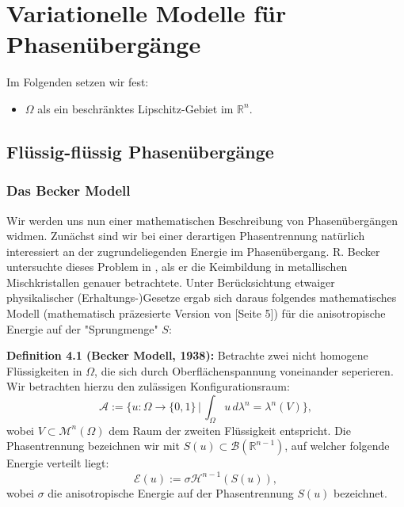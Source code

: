\chapter{Variationelle Modelle für Phasenübergänge}{\label{ch:calcvarphase}}
Im Folgenden setzen wir fest:
\begin{itemize}
    \item \(\Omega\) als ein beschränktes Lipschitz-Gebiet im \(\mathbb{R}^n\).
\end{itemize}
\section{Flüssig-flüssig Phasenübergänge}{\label{sec:flflphase}}
\subsection{Das Becker Modell}{\label{subsec:becker}}
Wir werden uns nun einer mathematischen Beschreibung von Phasenübergängen widmen. Zunächst sind wir bei einer derartigen Phasentrennung natürlich interessiert an der zugrundeliegenden Energie im Phasenübergang. R. Becker untersuchte dieses Problem in \cite{BeckerKeimbildung}, als er die Keimbildung in metallischen Mischkristallen genauer betrachtete. Unter Berücksichtung etwaiger physikalischer (Erhaltungs-)Gesetze ergab sich daraus folgendes mathematisches Modell (mathematisch präzesierte Version von \cite{ambrosio2000variational}[Seite 5]) für die anisotropische Energie auf der "Sprungmenge" \(S\):\\[0.5cm]
\colorbox{generalYellow}{\begin{minipage}{16cm}{\textcolor{black}{}{\label{def4.1}}}
\textbf{Definition 4.1 (Becker Modell, 1938):} Betrachte zwei nicht homogene Flüssigkeiten in \(\Omega\), die sich durch Oberflächenspannung voneinander seperieren. Wir betrachten hierzu den zulässigen Konfigurationsraum:
\begin{equation}
    \mathcal{A} := \{u : \Omega \to \{0,1\} \, | \, \int_{\Omega} u \, d\lambda^n = \lambda^n(V)\},
\end{equation}
wobei \(V \subset \mathcal{M}^n(\Omega)\) dem Raum der zweiten Flüssigkeit entspricht.
Die Phasentrennung bezeichnen wir mit \(S(u) \subset \mathcal{B}(\mathbb{R}^{n-1})\), auf welcher folgende Energie verteilt liegt:
\begin{equation}
    \mathcal{E}(u) := \sigma \mathcal{H}^{n-1}(S(u)),
\end{equation}
wobei \(\sigma\) die anisotropische Energie auf der Phasentrennung \(S(u)\) bezeichnet.
\end{minipage}}


